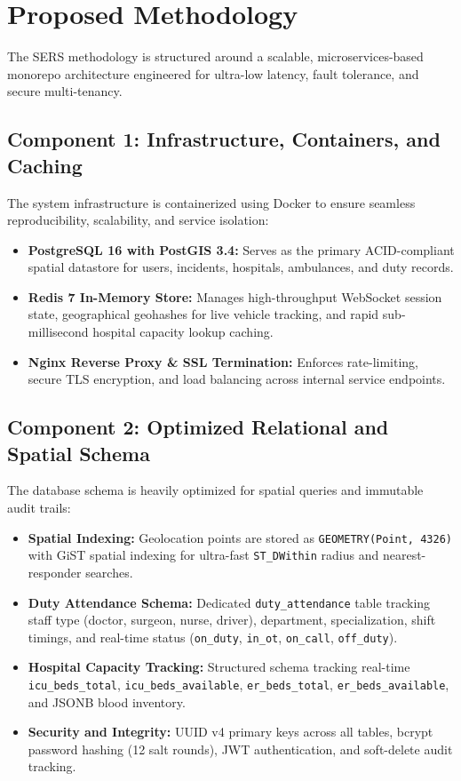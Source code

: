 \documentclass[12pt,a4paper]{article}
\begin{document}
\section{Proposed Methodology}
The SERS methodology is structured around a scalable, microservices-based monorepo architecture engineered for ultra-low latency, fault tolerance, and secure multi-tenancy.

\subsection{Component 1: Infrastructure, Containers, and Caching}
The system infrastructure is containerized using Docker to ensure seamless reproducibility, scalability, and service isolation:
\begin{itemize}
    \item \textbf{PostgreSQL 16 with PostGIS 3.4:} Serves as the primary ACID-compliant spatial datastore for users, incidents, hospitals, ambulances, and duty records.
    \item \textbf{Redis 7 In-Memory Store:} Manages high-throughput WebSocket session state, geographical geohashes for live vehicle tracking, and rapid sub-millisecond hospital capacity lookup caching.
    \item \textbf{Nginx Reverse Proxy \& SSL Termination:} Enforces rate-limiting, secure TLS encryption, and load balancing across internal service endpoints.
\end{itemize}

\subsection{Component 2: Optimized Relational and Spatial Schema}
The database schema is heavily optimized for spatial queries and immutable audit trails:
\begin{itemize}
    \item \textbf{Spatial Indexing:} Geolocation points are stored as \texttt{GEOMETRY(Point, 4326)} with GiST spatial indexing for ultra-fast \texttt{ST\_DWithin} radius and nearest-responder searches.
    \item \textbf{Duty Attendance Schema:} Dedicated \texttt{duty\_attendance} table tracking staff type (doctor, surgeon, nurse, driver), department, specialization, shift timings, and real-time status (\texttt{on\_duty}, \texttt{in\_ot}, \texttt{on\_call}, \texttt{off\_duty}).
    \item \textbf{Hospital Capacity Tracking:} Structured schema tracking real-time \texttt{icu\_beds\_total}, \texttt{icu\_beds\_available}, \texttt{er\_beds\_total}, \texttt{er\_beds\_available}, and JSONB blood inventory.
    \item \textbf{Security and Integrity:} UUID v4 primary keys across all tables, bcrypt password hashing (12 salt rounds), JWT authentication, and soft-delete audit tracking.
\end{itemize}
\end{document}
